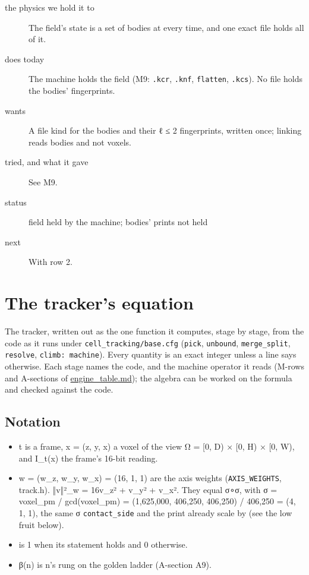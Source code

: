 \begin{description}
\item[{the physics we hold it to}] The field's state is a set of bodies at every time, and one exact file holds all of it.
\item[{does today}] The machine holds the field (M9: \texttt{.\allowbreak{}kcr}, \texttt{.\allowbreak{}knf}, \texttt{flatten}, \texttt{.\allowbreak{}kcs}). No file holds the bodies' fingerprints.
\item[{wants}] A file kind for the bodies and their ℓ ≤ 2 fingerprints, written once; linking reads bodies and not voxels.
\item[{tried, and what it gave}] See M9.
\item[{status}] field held by the machine; bodies' prints not held
\item[{next}] With row 2.
\end{description}

\section{\texorpdfstring{The tracker's equation}{The tracker's equation}}

The tracker, written out as the one function it computes, stage by stage, from the code as it runs under \texttt{cell\_\allowbreak{}tracking/\allowbreak{}base.\allowbreak{}cfg} (\texttt{pick}, \texttt{unbound}, \texttt{merge\_\allowbreak{}split}, \texttt{resolve}, \texttt{climb: machine}). Every quantity is an exact integer unless a line says otherwise. Each stage names the code, and the machine operator it reads (M-rows and A-sections of \hyperref[chap:engine-table]{engine\_\allowbreak{}table.md}); the algebra can be worked on the formula and checked against the code.

\subsection{\texorpdfstring{Notation}{Notation}}

\begin{itemize}
\item t is a frame, x = (z, y, x) a voxel of the view Ω = [0, D) × [0, H) × [0, W), and I\_\allowbreak{}t(x) the frame's 16-bit reading.
\item w = (w\_\allowbreak{}z, w\_\allowbreak{}y, w\_\allowbreak{}x) = (16, 1, 1) are the axis weights (\texttt{AXIS\_\allowbreak{}WEIGHTS}, track.h). ‖v‖²\_\allowbreak{}w = 16v\_\allowbreak{}z² + v\_\allowbreak{}y² + v\_\allowbreak{}x². They equal σ∘σ, with σ = voxel\_\allowbreak{}pm / gcd(voxel\_\allowbreak{}pm) = (1,625,000, 406,250, 406,250) / 406,250 = (4, 1, 1), the same σ \texttt{contact\_\allowbreak{}side} and the print already scale by (see the low fruit below).
\item [·] is 1 when its statement holds and 0 otherwise.
\item β(n) is n's rung on the golden ladder (A-section A9).
\end{itemize}

